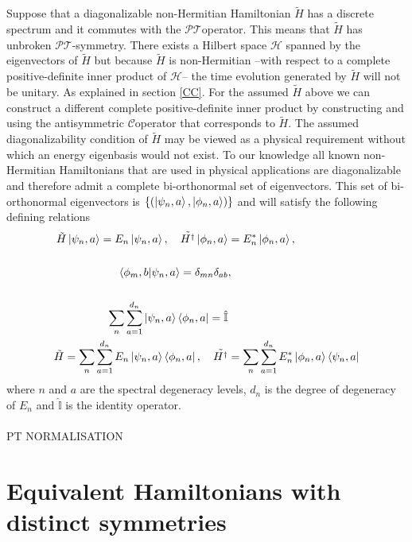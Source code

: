 \documentclass[12pt, a4paper]{report}
\newcommand\PT{\(\mathcal{PT}\)}
\newcommand\CC{\(\mathcal{C}\)}
\begin{document}
Suppose that a diagonalizable non-Hermitian Hamiltonian $\tilde{H}$ has a discrete spectrum and it commutes with the \PT\:operator.  This means that  $\tilde{H}$ has unbroken \PT-symmetry. There exists a Hilbert space $\mathcal{H}$ spanned by the eigenvectors of $\tilde{H}$ but because $\tilde{H}$ is non-Hermitian --with respect to a complete positive-definite inner product of $\mathcal{H}$-- the time evolution generated by $\tilde{H}$ will not be unitary\cite{Mostafazadeh}.
As explained in section \ref{CC}. For the assumed $\tilde{H}$ above we can construct a different complete positive-definite inner product by constructing and using the antisymmetric \CC\:operator that corresponds to $\tilde{H}$.
The assumed diagonalizability condition of $\tilde{H}$ may be viewed as a physical requirement without which an energy eigenbasis would not exist. To our knowledge all known non-Hermitian Hamiltonians that are used in physical applications are diagonalizable and therefore admit a complete bi-orthonormal set of eigenvectors. This set of bi-orthonormal eigenvectors is $\{(\ket{\psi_{n}, a}, \ket{\phi_{n}, a})\}$ and will satisfy the
following defining relations\cite{Pseudo-HermiticityIII}
\begin{align}
\tilde{H}\ket{\psi_{n}, a} = E_{n}\ket{\psi_{n}, a},\quad\tilde{H^{\dagger}}\ket{\phi_{n}, a} &= E^{*}_{n}\ket{\phi_{n}, a},\\
\nonumber\\
\braket{\phi_{m}, b|\psi_{n}, a} = \delta_{mn}\delta_{ab}&,\\
\nonumber\\
\sum^{}_{n}\sum_{a=1}^{d_n}\ket{\psi_{n}, a}\bra{\phi_{n}, a} = \hat{\mathbb{I}}&\\
\tilde{H} = \sum^{}_{n}\sum_{a=1}^{d_n}E_{n}\ket{\psi_{n}, a}\bra{\phi_{n}, a},\quad\tilde{H^{\dagger}} &= \sum^{}_{n}\sum_{a=1}^{d_n}E_{n}^{*}\ket{\phi_{n}, a}\bra{\psi_{n}, a}
\end{align}
where $n$ and $a$ are the spectral degeneracy levels, $d_n$ is the degree of degeneracy of $E_n$ and $\hat{\mathbb{I}}$ is the identity operator\cite{Pseudo-HermiticityIII}.\\\\
PT NORMALISATION\\

\chapter{Equivalent Hamiltonians with distinct symmetries}\label{Equiv}
\end{document}
